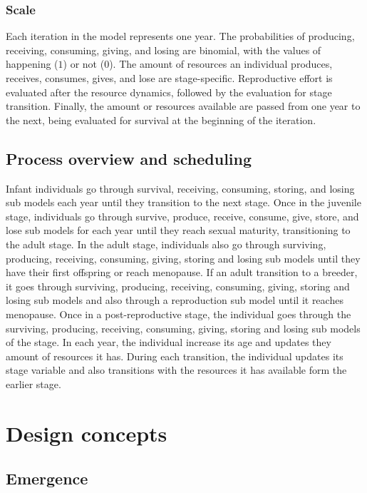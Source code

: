 \documentclass{article}
\begin{document}
\subsubsection{Scale}

Each iteration in the model represents one year. The probabilities  of producing, receiving, consuming, giving, and losing are binomial, with the values of happening ($1$) or not ($0$). The amount of resources an individual produces, receives, consumes, gives, and lose are stage-specific. Reproductive effort is evaluated after the resource dynamics, followed by the evaluation for stage transition. Finally, the amount or resources available are passed from one year to the next, being evaluated for survival at the beginning of the iteration.

\subsection{Process overview and scheduling}

Infant individuals go through survival, receiving, consuming, storing, and losing sub models each year until they transition to the next stage. Once in the juvenile stage, individuals go through survive, produce, receive, consume, give, store, and lose sub models for each year until they reach sexual maturity, transitioning to the adult stage. In the adult stage, individuals also go through surviving, producing, receiving, consuming, giving, storing and losing sub models until they have their first offspring or reach menopause. If an adult transition to a breeder, it goes through surviving, producing, receiving, consuming, giving, storing and losing sub models and also through a reproduction sub model until it reaches menopause. Once in a post-reproductive stage, the individual goes through the surviving, producing, receiving, consuming, giving, storing and losing sub models of the stage. In each year, the individual increase its age and updates they amount of resources it has. During each transition, the individual updates its stage variable and also transitions with the resources it has available form the earlier stage.

\section{Design concepts}

\subsection{Emergence}
\end{document}
